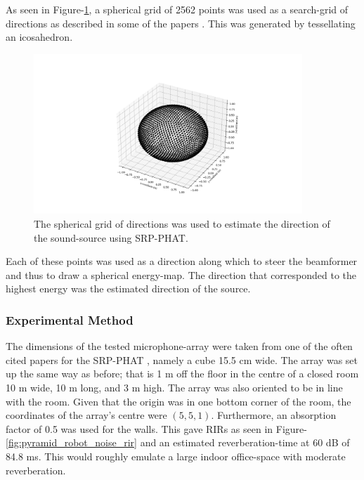 \documentclass[notitlepage]{report}
\begin{document}
As seen in Figure-\ref{fig:srp_phat_grid}, a spherical grid of 2562 points was used as a search-grid of directions as described in some of the papers \cite{valin_localization_2004} \cite{valin_robust_2007}. This was generated by tessellating an icosahedron.

\begin{figure}[H]
\includegraphics[width=0.9\textwidth]{../Python/srp_phat/grid.png}
\centering
\caption{The spherical grid of directions was used to estimate the direction of the sound-source using SRP-PHAT.}
\label{fig:srp_phat_grid}
\centering
\end{figure}

Each of these points was used as a direction along which to steer the beamformer and thus to draw a spherical energy-map. The direction that corresponded to the highest energy was the estimated direction of the source.

\subsubsection{Experimental Method}

The dimensions of the tested microphone-array were taken from one of the often cited papers for the SRP-PHAT \cite{valin_robust_2007}, namely a cube 15.5 \si{cm} wide. The array was set up the same way as before; that is 1 \si{m} off the floor in the centre of a closed room 10 \si{m} wide, 10 \si{m} long, and 3 \si{m} high. The array was also oriented to be in line with the room. Given that the origin was in one bottom corner of the room, the coordinates of the array's centre were $(5,5,1)$. Furthermore, an absorption factor of 0.5 was used for the walls. This gave RIRs as seen in Figure-\ref{fig:pyramid_robot_noise_rir} and an estimated reverberation-time at 60 \si{dB} of 84.8 \si{ms}. This would roughly emulate a large indoor office-space with moderate reverberation.
\end{document}
